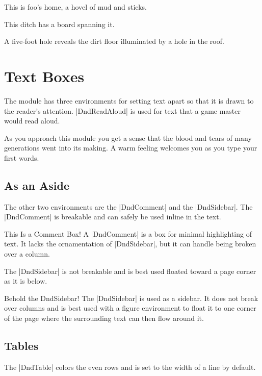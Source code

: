\documentclass[10pt,twoside,twocolumn,openany,nodepracetedcode]{dndbook}
\begin{document}
This is foo's home, a hovel of mud and sticks.

This ditch has a board spanning it.

A five-foot hole reveals the dirt floor illuminated by a hole in the roof.

\chapter{Text Boxes}

The module has three environments for setting text apart so that it is drawn to the reader's attention. |DndReadAloud| is used for text that a game master would read aloud.

\begin{DndReadAloud}
  As you approach this module you get a sense that the blood and tears of many generations went into its making. A warm feeling welcomes you as you type your first words.
\end{DndReadAloud}

\section{As an Aside}
The other two environments are the |DndComment| and the |DndSidebar|. The |DndComment| is breakable and can safely be used inline in the text.

\begin{DndComment}{This Is a Comment Box!}
  A |DndComment| is a box for minimal highlighting of text. It lacks the ornamentation of |DndSidebar|, but it can handle being broken over a column.
\end{DndComment}

The |DndSidebar| is not breakable and is best used floated toward a page corner as it is below.

\begin{DndSidebar}[float=!b]{Behold the DndSidebar!}
  The |DndSidebar| is used as a sidebar. It does not break over columns and is best used with a figure environment to float it to one corner of the page where the surrounding text can then flow around it.
\end{DndSidebar}

\section{Tables}
The |DndTable| colors the even rows and is set to the width of a line by default.
\end{document}

